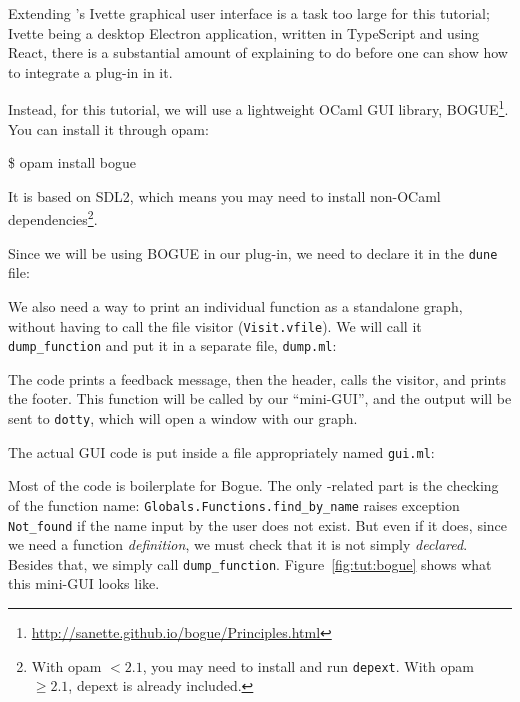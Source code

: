 Extending \framac's Ivette graphical user interface is a task too large for
this tutorial; Ivette being a desktop Electron application, written in
TypeScript and using React, there is a substantial amount of explaining to
do before one can show how to integrate a \framac plug-in in it.

Instead, for this tutorial, we will use a lightweight OCaml GUI library,
BOGUE\footnote{\url{http://sanette.github.io/bogue/Principles.html}}.
You can install it through opam:

\begin{shell}
\$ opam install bogue
\end{shell}

It is based on SDL2, which means you may need to install non-OCaml
dependencies\footnote{With opam $< 2.1$, you may need to install and
run \texttt{depext}. With opam $\geq 2.1$, depext is already included.}.

Since we will be using BOGUE in our plug-in, we need to declare it in the
\texttt{dune} file:


We also need a way to print an individual function as a standalone graph,
without having to call the file visitor (\verb|Visit.vfile|). We will call
it \verb|dump_function| and put it in a separate file, \verb|dump.ml|:


The code prints a feedback message, then the header, calls the visitor,
and prints the footer. This function will be called by our ``mini-GUI'',
and the output will be sent to \texttt{dotty}, which will open a window
with our graph.

The actual GUI code is put inside a file appropriately named \texttt{gui.ml}:


Most of the code is boilerplate for Bogue. The only \framac-related part is
the checking of the function name: \verb|Globals.Functions.find_by_name| raises
exception \verb|Not_found| if the name input by the user does not exist. But
even if it does, since we need a function {\em definition}, we must check that
it is not simply {\em declared}. Besides that, we simply call
\verb|dump_function|. Figure~\ref{fig:tut:bogue} shows what this mini-GUI looks
like.


